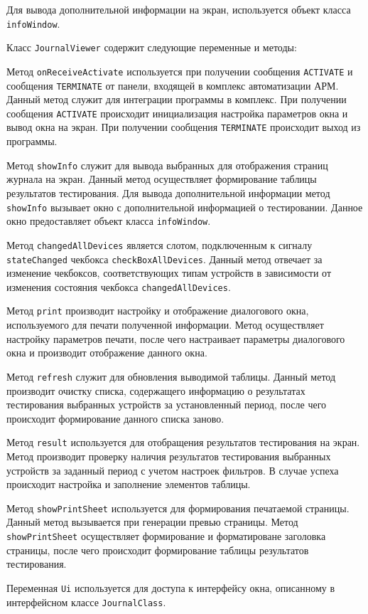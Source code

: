 Для вывода дополнительной информации на экран, используется объект класса \texttt{infoWindow}.

Класс \texttt{JournalViewer} содержит следующие переменные и методы:
\begin{enum}
	\item Метод \texttt{onReceiveActivate} используется при получении сообщения \texttt{ACTIVATE} и сообщения \texttt{TERMINATE} от
		панели, входящей в комплекс автоматизации АРМ. Данный метод служит для интеграции программы в комплекс. При
		получении сообщения \texttt{ACTIVATE} происходит инициализация настройка параметров окна и вывод окна на экран.
		При получении сообщения \texttt{TERMINATE} происходит выход из программы.
	\item Метод \texttt{showInfo} служит для вывода выбранных для отображения страниц журнала на экран. Данный метод
		осуществляет формирование таблицы результатов тестирования. Для вывода дополнительной информации метод
		\texttt{showInfo} вызывает окно с дополнительной информацией о тестировании. Данное окно предоставляет
		объект класса \texttt{infoWindow}.
	\item Метод \texttt{changedAllDevices} является слотом, подключенным к сигналу \texttt{stateChanged} чекбокса
		\texttt{checkBoxAllDevices}. Данный метод отвечает за изменение чекбоксов, соответствующих типам
		устройств в зависимости от изменения состояния чекбокса \texttt{changedAllDevices}.
	\item Метод \texttt{print} производит настройку и отображение диалогового окна, используемого для печати
		полученной информации. Метод осуществляет настройку параметров печати, после чего настраивает параметры
		диалогового окна и производит отображение данного окна.
	\item Метод \texttt{refresh} служит для обновления выводимой таблицы. Данный метод производит очистку списка,
		содержащего информацию о результатах тестирования выбранных устройств за установленный период, после
		чего происходит формирование данного списка заново.
	\item Метод \texttt{result} используется для отобращения результатов тестирования на экран. Метод производит
		проверку наличия результатов тестирования выбранных устройств за заданный период с учетом настроек
		фильтров. В случае успеха происходит настройка и заполнение элементов таблицы.
	\item Метод \texttt{showPrintSheet} используется для формирования печатаемой страницы. Данный метод вызывается
		при генерации превью страницы. Метод \texttt{showPrintSheet} осуществляет формирование и форматироване заголовка
		страницы, после чего происходит формирование таблицы результатов тестирования.
	\item Переменная \texttt{Ui} используется для доступа к интерфейсу окна, описанному в интерфейсном классе
		\texttt{JournalClass}.
\end{enum}

